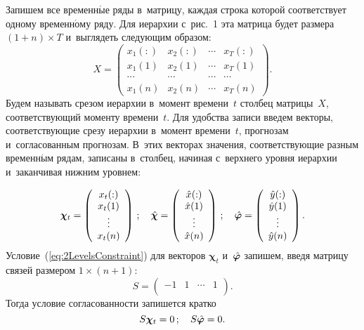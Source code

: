\begin{multicols}{2}
Запишем все временн$\acute{\mbox{ы}}$е ряды в~матрицу, каждая строка которой
соответствует одному временн$\acute{\mbox{о}}$му ряду. Для иерархии
с~рис.~1 эта матрица будет размера $(1 + n)
\times T$ и~выглядеть следующим образом:
\begin{equation*}
    X = \left(%
\begin{array}{cccc}
  x_1(:) & x_2(:) & \cdots & x_T(:) \\[6pt]
  x_1(1) & x_2(1) & \cdots & x_T(1) \\[6pt]
  \cdots & \cdots & \cdots & \cdots \\[6pt]
  x_1(n) & x_2(n) & \cdots & x_T(n)
\end{array}%
\right).
\end{equation*}
Будем называть срезом иерархии в~момент времени~$t$ столбец
матрицы~$X$, соответствующий моменту времени~$t$. Для удобства
записи введем векторы, соответствующие срезу иерархии в~момент
времени~$t$, прогнозам и~согласованным прогнозам. В~этих векторах
значения, соответствующие разным временн$\acute{\mbox{ы}}$м рядам,
записаны в~столбец, начиная с~верхнего уровня иерархии и~заканчивая нижним
уровнем:

\noindent
$$
    \boldsymbol{\chi}_t = \left(%
    \begin{array}{c}
        x_t(:) \\
        x_t(1) \\
        \vdots \\
        x_t(n) \\
    \end{array}%
    \right)\,; \quad
    \hchi = \left(%
    \begin{array}{c}
        \hx(:) \\
        \hx(1) \\
        \vdots \\
        \hx(n) \\
    \end{array}%
    \right)\,; \quad
    \hphi = \left(%
    \begin{array}{c}
        \hy(:) \\
        \hy(1) \\
        \vdots \\
        \hy(n) \\
    \end{array}%
    \right).
$$
Условие~(\ref{eq:2LevelsConstraint}) для векторов
$\boldsymbol{\chi}_t$ и~$\hat{\boldsymbol{\varphi}}$ запишем, введя мат\-ри\-цу
связей размером $1 \times (n + 1)$:
$$
    S = \left(%
        \begin{array}{cccc}
            -1 & 1 & \cdots & 1 \\
        \end{array}%
        \right).
$$
Тогда условие согласованности запишется кратко
$$
    S \boldsymbol{\chi}_t = 0\,; \quad S \hat{\boldsymbol{\varphi}} = 0.
$$


\end{multicols}
